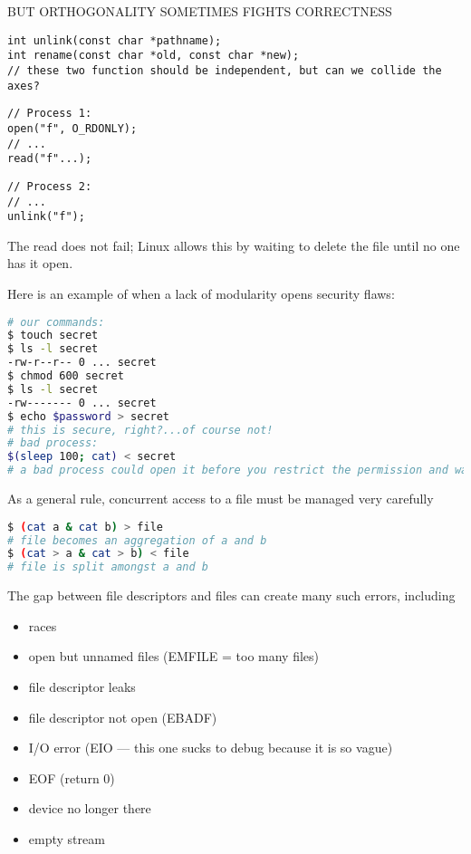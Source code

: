 \documentclass[../../lecture_notes.tex]{subfiles}
\begin{document}
BUT ORTHOGONALITY SOMETIMES FIGHTS CORRECTNESS
\begin{lstlisting}
int unlink(const char *pathname);
int rename(const char *old, const char *new);
// these two function should be independent, but can we collide the axes?
\end{lstlisting}
\begin{minipage}{0.5\linewidth}
\begin{lstlisting}
// Process 1:
open("f", O_RDONLY); 
// ...
read("f"...);
\end{lstlisting}
\end{minipage}%
\begin{minipage}{0.5\linewidth}
\begin{lstlisting}
// Process 2: 
// ...
unlink("f");
\end{lstlisting}
\end{minipage}

The read does not fail; Linux allows this by waiting to delete the file until no one has it open.

Here is an example of when a lack of modularity opens security flaws:
\begin{lstlisting}[language=sh]
# our commands:
$ touch secret
$ ls -l secret
-rw-r--r-- 0 ... secret
$ chmod 600 secret
$ ls -l secret
-rw------- 0 ... secret
$ echo $password > secret
# this is secure, right?...of course not!
# bad process:
$(sleep 100; cat) < secret
# a bad process could open it before you restrict the permission and wait!
\end{lstlisting}


As a general rule, concurrent access to a file must be managed very carefully
\begin{lstlisting}[language=sh]
$ (cat a & cat b) > file
# file becomes an aggregation of a and b
$ (cat > a & cat > b) < file
# file is split amongst a and b
\end{lstlisting}

The gap between file descriptors and files can create many such errors, including
\begin{itemize}[nosep]
\item races
\item open but unnamed files (EMFILE = too many files)
\item file descriptor leaks
\item file descriptor not open (EBADF)
\item I/O error (EIO --- this one sucks to debug because it is so vague)
\item EOF (return 0)
\item device no longer there
\item empty stream
\end{itemize}
\end{document}
